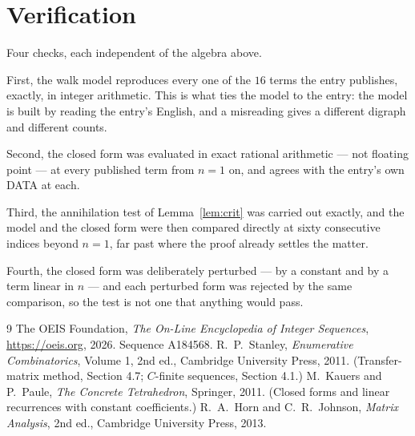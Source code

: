 \documentclass[11pt,a4paper]{article}
\theoremstyle{plain}
\theoremstyle{definition}
\begin{document}
\section{Verification}

Four checks, each independent of the algebra above.

First, the walk model reproduces every one of the $16$ terms the entry publishes,
exactly, in integer arithmetic. This is what ties the model to the entry: the model is built
by reading the entry's English, and a misreading gives a different digraph and different
counts.

Second, the closed form was evaluated in exact rational arithmetic --- not floating point ---
at every published term from $n=1$ on, and agrees with the entry's own DATA at each.

Third, the annihilation test of Lemma~\ref{lem:crit} was carried out exactly, and the model
and the closed form were then compared directly at sixty consecutive indices beyond
$n=1$, far past where the proof already settles the matter.

Fourth, the closed form was deliberately perturbed --- by a constant and by a term linear in
$n$ --- and each perturbed form was rejected by the same comparison, so the test is not one
that anything would pass.

\begin{thebibliography}{9}
 The OEIS Foundation, \emph{The On-Line Encyclopedia of Integer
Sequences}, \url{https://oeis.org}, 2026. Sequence A184568.
 R.~P.~Stanley, \emph{Enumerative Combinatorics}, Volume 1, 2nd ed.,
Cambridge University Press, 2011. (Transfer-matrix method, Section 4.7; $C$-finite sequences,
Section 4.1.)
 M.~Kauers and P.~Paule, \emph{The Concrete Tetrahedron}, Springer, 2011.
(Closed forms and linear recurrences with constant coefficients.)
 R.~A.~Horn and C.~R.~Johnson, \emph{Matrix Analysis}, 2nd ed., Cambridge
University Press, 2013.
\end{thebibliography}
\end{document}
